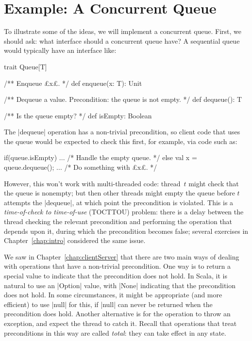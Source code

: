 
\section{Example: A Concurrent Queue}
\label{sec:total-queue}

To illustrate some of the ideas, we will implement a concurrent queue.  First,
we should ask: what interface should a concurrent queue have?  A sequential
queue would typically have an interface like:
%
\begin{scala}
trait Queue[T]{
  /** Enqueue £x£. */
  def enqueue(x: T): Unit

  /** Dequeue a value.  Precondition: the queue is not empty. */
  def dequeue(): T

  /** Is the queue empty? */
  def isEmpty: Boolean
}
\end{scala}
%
The |dequeue| operation has a non-trivial precondition, so client code that
uses the queue would be expected to check this first, for example, via code
such as:
\begin{scala}
  if(queue.isEmpty){ ... /* Handle the empty queue. */ } 
  else{ val x = queue.dequeue(); ... /* Do something with £x£. */ }
\end{scala}

However, this won't work with multi-threaded code: thread~$t$ might check that
the queue is nonempty; but then other threads might empty the queue before
$t$ attempts the |dequeue|, at which point the precondition is violated.  This
is a \emph{time-of-check to time-of-use}
(TOCTTOU) problem: there is a delay between the thread checking the relevant
precondition and performing the operation that depends upon it, during which
the precondition becomes false; several exercises in Chapter~\ref{chap:intro}
considered the same issue.

We saw in Chapter~\ref{chap:clientServer} that there are two main ways of
dealing with operations that have a non-trivial precondition.  One way is to
return a special value to indicate that the precondition does not hold.  In
Scala, it is natural to use an |Option| value, with |None| indicating that the
precondition does not hold.  In some circumstances, it might be appropriate
(and more efficient) to use |null| for this, if |null| can never be returned
when the precondition does hold.  Another alternative is for the operation to
throw an exception, and expect the thread to catch it.  Recall that operations
that treat preconditions in this way are called \emph{total}: they can take
effect in any state.

